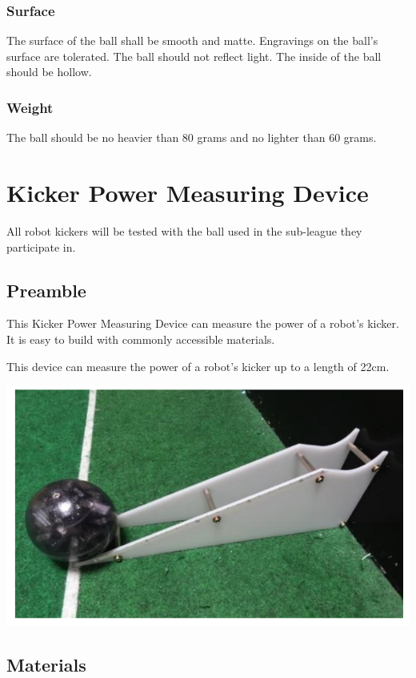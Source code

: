 \documentclass{article}
\begin{document}
\subsubsection{Surface}

The surface of the ball shall be smooth and matte. Engravings on the ball's
surface are tolerated. The ball should not reflect light. The inside of the
ball should be hollow.

\subsubsection{Weight}

The ball should be no heavier than 80 grams and no lighter than 60 grams.

\section{Kicker Power Measuring Device\label{ref-064}}

All robot kickers will be tested with the ball used in the sub-league they
participate in.

\subsection{Preamble}

This Kicker Power Measuring Device can measure the power of a robot's kicker.
It is easy to build with commonly accessible materials.

This device can measure the power of a robot's kicker up to a length of 22cm.

\includegraphics[width=1\textwidth]{media/image8.png}

\subsection{Materials}
\end{document}
